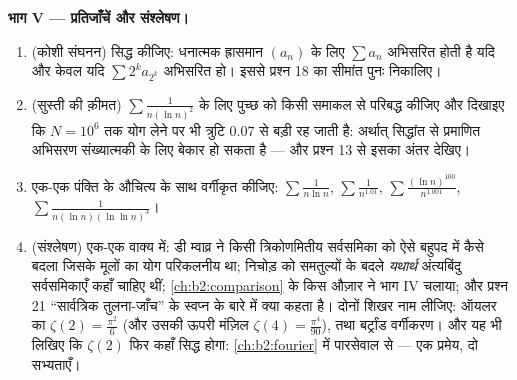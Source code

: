 \begin{problem}[{सप्ताहांत समस्या --- $\zeta(2) = \pi^2/6$ और बर्ट्रांड
परिदृश्य}]
\medskip
\noindent\textbf{भाग V --- प्रतिजाँचें और संश्लेषण।}
\begin{enumerate}[resume]
  \item (कोशी संघनन) सिद्ध कीजिए: धनात्मक ह्रासमान $(a_n)$ के लिए $\sum a_n$
        अभिसरित होती है यदि और केवल यदि $\sum 2^k a_{2^k}$ अभिसरित हो। इससे प्रश्न 18
        का सीमांत पुनः निकालिए।
  \item (सुस्ती की क़ीमत) $\sum\frac1{n(\ln n)^2}$ के लिए पुच्छ को किसी समाकल से परिबद्ध
        कीजिए और दिखाइए कि $N = 10^6$ तक योग लेने पर भी त्रुटि $0.07$ से बड़ी रह
        जाती है: अर्थात् सिद्धांत से प्रमाणित अभिसरण संख्यात्मकी के लिए
        बेकार हो सकता है --- और प्रश्न 13 से इसका अंतर देखिए।
  \item एक-एक पंक्ति के औचित्य के साथ वर्गीकृत कीजिए: $\sum\frac1{n\ln n}$, $\sum\frac1{n^{1.01}}$, $\sum\frac{(\ln n)^{100}}{n^{1.001}}$,
        $\sum\frac1{n(\ln n)(\ln\ln n)^{3}}$।
  \item (संश्लेषण) एक-एक वाक्य में: डी म्वाव्र ने किसी त्रिकोणमितीय
        सर्वसमिका को ऐसे बहुपद में कैसे बदला जिसके मूलों का योग परिकलनीय
        था; निचोड़ को समतुल्यों के बदले \emph{यथार्थ} अंत्यबिंदु
        सर्वसमिकाएँ कहाँ चाहिए थीं; \cref{ch:b2:comparison} के किस औज़ार ने भाग IV चलाया;
        और प्रश्न 21 ``सार्वत्रिक तुलना-जाँच'' के स्वप्न के बारे में
        क्या कहता है। दोनों शिखर नाम लीजिए: ऑयलर का $\zeta(2) = \frac{\pi^2}6$ (और उसकी ऊपरी
        मंज़िल $\zeta(4) = \frac{\pi^4}{90}$), तथा बर्ट्रांड वर्गीकरण। और यह भी लिखिए कि $\zeta(2)$
        फिर कहाँ सिद्ध होगा: \cref{ch:b2:fourier} में पारसेवाल से --- एक प्रमेय, दो
        सभ्यताएँ।
\end{enumerate}
\end{problem}
